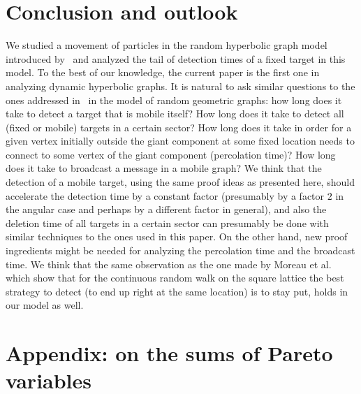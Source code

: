 \documentclass[12pt]{article}
\begin{document}
\section{Conclusion and outlook}\label{sec:conclusion}
We studied a movement of particles in the random hyperbolic graph model introduced by~\cite{KPKVB10} and analyzed the tail of detection times of a fixed target in this model. To the best of our knowledge, the current paper is the first one in analyzing dynamic hyperbolic graphs. It is natural to ask similar questions to the ones addressed in~\cite{Peres2010} in the model of random geometric graphs: how long does it take to detect a target that is mobile itself? How long does it take to detect all (fixed or mobile) targets in a certain sector? How long does it take in order for a given vertex initially outside the giant component at some fixed location needs to connect to some vertex of the giant component (percolation time)? How long does it take to broadcast a message in a mobile graph? We think that the detection of a mobile target, using the same proof ideas as presented here, should accelerate the detection time by a constant factor (presumably by a factor $2$ in the angular case and perhaps by a different factor in general), and also the deletion time of all targets in a certain sector can presumably be done with similar techniques to the ones used in this paper. On the other hand, new proof ingredients might be needed for analyzing the percolation time and the broadcast time. We think that the same observation as the one made by Moreau et al.~\cite{Moreau} which show that for the continuous random walk on the square lattice the best strategy to detect (to end up right at the same location) is to stay put, holds in our model as well.

\appendix
\section{Appendix: on the sums of Pareto variables}


\small
%
%
\printbibliography
\end{document}
